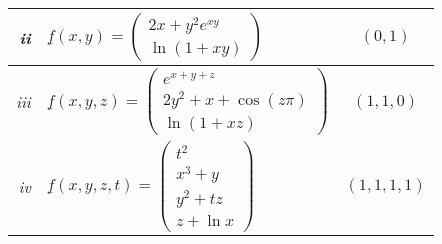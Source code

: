 \begin{enumerate}
\begin{center}
\begin{tabular}{|r||l|c|}
\hline
{\it ii} &$\underline{f}(x,y)=\left(\begin{array}{l} 2x+y^2e^{xy} \\
\ln(1+xy) \end{array}\right) $ & $(0,1)$ \\
\hline
{\it iii} &$\underline{f}(x,y,z)=\left(\begin{array}{l} e^{x+y+z} \\
2y^2+x+\cos(z\pi)\\
\ln(1+xz) \end{array}\right) $ & $(1,1,0)$ \\
\hline
{\it iv}& $\underline{f}(x,y,z,t)=\left(\begin{array}{l} t^2 \\
x^3+y\\
y^2+tz\\
z+\ln x \end{array}\right) $ & $(1,1,1,1)$\\
\hline
\end{tabular}
\end{center}


\end{enumerate}
